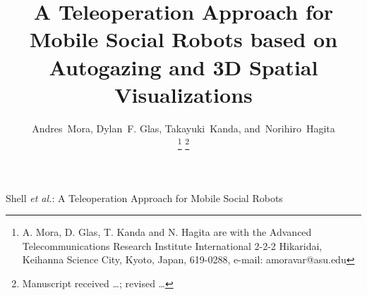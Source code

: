 \documentclass[journal]{IEEEtran}
\begin{document}
\title{A Teleoperation Approach for Mobile Social Robots based on Autogazing and 3D Spatial Visualizations}
%
%
%

\author{Andres~Mora,
Dylan~F. Glas,
Takayuki~Kanda,
and~Norihiro~Hagita
\\
\thanks{A. Mora, D. Glas, T. Kanda and N. Hagita are with the Advanced Telecommunications Research Institute International
2-2-2 Hikaridai, Keihanna Science City, Kyoto, Japan, 619-0288, e-mail: amoravar@asu.edu}%
\thanks{Manuscript received \ldots; revised \ldots}}

%
%



%
{Shell \MakeLowercase{\textit{et al.}}: A Teleoperation Approach for Mobile Social Robots}
%
\end{document}
